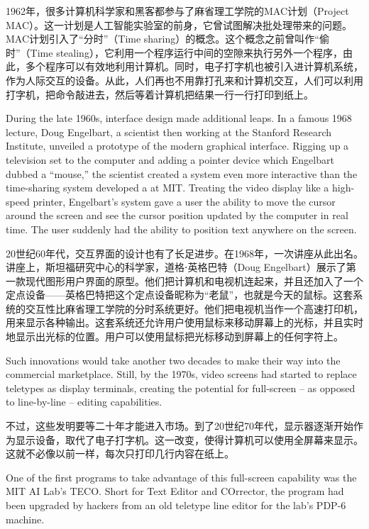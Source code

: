 \ifdefined\chs
1962年，很多计算机科学家和黑客都参与了麻省理工学院的MAC计划（Project MAC）。这一计划是人工智能实验室的前身，它曾试图解决批处理带来的问题。MAC计划引入了``分时''（Time sharing）的概念。这个概念之前曾叫作``偷时''（Time stealing），它利用一个程序运行中间的空隙来执行另外一个程序，由此，多个程序可以有效地利用计算机。同时，电子打字机也被引入进计算机系统，作为人际交互的设备。从此，人们再也不用靠打孔来和计算机交互，人们可以利用打字机，把命令敲进去，然后等着计算机把结果一行一行打印到纸上。
\fi

\ifdefined\eng
During the late 1960s, interface design made additional leaps. In a famous 1968 lecture, Doug Engelbart, a scientist then working at the Stanford Research Institute, unveiled a prototype of the modern graphical interface. Rigging up a television set to the computer and adding a pointer device which Engelbart dubbed a ``mouse,'' the scientist created a system even more interactive than the time-sharing system developed \ifdefined\vone a \fi\ifdefined\vtwo at \fi MIT. Treating the video display like a high-speed printer, Engelbart's system gave a user the ability to move the cursor around the screen and see the cursor position updated by the computer in real time. The user suddenly had the ability to position text anywhere on the screen.
\fi

\ifdefined\chs
20世纪60年代，交互界面的设计也有了长足进步。在1968年，一次讲座从此出名。讲座上，斯坦福研究中心的科学家，道格⋅英格巴特（Doug Engelbart）展示了第一款现代图形用户界面的原型。他们把计算机和电视机连起来，并且还加入了一个定点设备——英格巴特把这个定点设备昵称为``老鼠''，也就是今天的鼠标。这套系统的交互性比麻省理工学院的分时系统更好。他们把电视机当作一个高速打印机，用来显示各种输出。这套系统还允许用户使用鼠标来移动屏幕上的光标，并且实时地显示出光标的位置。用户可以使用鼠标把光标移动到屏幕上的任何字符上。
\fi

\ifdefined\eng
Such innovations would take another two decades to make their way into the commercial marketplace. Still, by the 1970s, video screens had started to replace teletypes as display terminals, creating the potential for full-screen -- as opposed to line-by-line -- editing capabilities.
\fi

\ifdefined\chs
不过，这些发明要等二十年才能进入市场。到了20世纪70年代，显示器逐渐开始作为显示设备，取代了电子打字机。这一改变，使得计算机可以使用全屏幕来显示。这就不必像以前一样，每次只打印几行内容在纸上。
\fi

\ifdefined\eng
One of the first programs to take advantage of this full-screen capability was the MIT AI Lab's TECO. Short for Text Editor and COrrector, the program had been upgraded by hackers from an old teletype line editor for the lab's PDP-6 machine.
\fi

